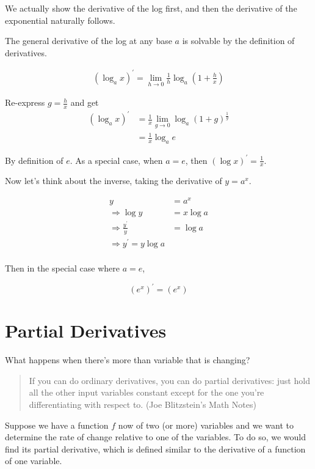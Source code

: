 \documentclass[
]{book}
\theoremstyle{definition}
\theoremstyle{definition}
\theoremstyle{definition}
\theoremstyle{definition}
\theoremstyle{remark}
\begin{document}
We actually show the derivative of the log first, and then the derivative of the exponential naturally follows.

The general derivative of the log at any base \(a\) is solvable by the definition of derivatives.

\begin{align*}
(\log_a x)^\prime = \lim\limits_{h\to 0} \frac{1}{h}\log_{a}\left(1 + \frac{h}{x}\right)
\end{align*}

Re-express \(g = \frac{h}{x}\) and get
\begin{align*}
(\log_a x)^\prime &= \frac{1}{x}\lim_{g\to 0}\log_{a} (1 + g)^{\frac{1}{g}}\\
&= \frac{1}{x}\log_a e
\end{align*}

By definition of \(e\). As a special case, when \(a = e\), then \((\log x)^\prime = \frac{1}{x}\).

Now let's think about the inverse, taking the derivative of \(y = a^x\).

\begin{align*}
y &= a^x \\
\Rightarrow \log y &= x \log a\\
\Rightarrow \frac{y^\prime}{y} &= \log a\\
\Rightarrow  y^\prime = y \log a\\
\end{align*}

Then in the special case where \(a = e\),

\[(e^x)^\prime = (e^x)\]

\hypertarget{partial-derivatives}{%
\section{Partial Derivatives}\label{partial-derivatives}}

What happens when there's more than variable that is changing?

\begin{quote}
If you can do ordinary derivatives, you can do partial derivatives: just hold all the other input variables constant except for the one you're differentiating with respect to. (Joe Blitzstein's Math Notes)
\end{quote}

Suppose we have a function \(f\) now of two (or more) variables and we want to determine the rate of change relative to one of the variables. To do so, we would find its partial derivative, which is defined similar to the derivative of a function of one variable.
\end{document}

